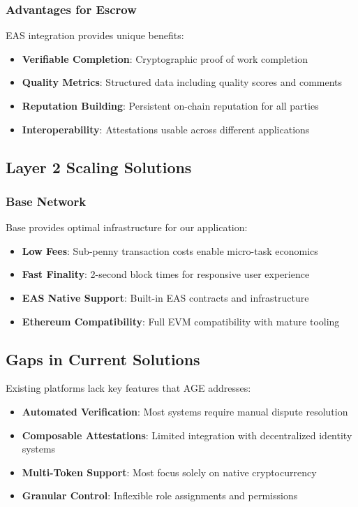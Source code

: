 \documentclass[12pt,a4paper]{article}
\begin{document}
\subsubsection{Advantages for Escrow}
EAS integration provides unique benefits:
\begin{itemize}
    \item \textbf{Verifiable Completion}: Cryptographic proof of work completion
    \item \textbf{Quality Metrics}: Structured data including quality scores and comments
    \item \textbf{Reputation Building}: Persistent on-chain reputation for all parties
    \item \textbf{Interoperability}: Attestations usable across different applications
\end{itemize}

\subsection{Layer 2 Scaling Solutions}

\subsubsection{Base Network}
Base provides optimal infrastructure for our application:
\begin{itemize}
    \item \textbf{Low Fees}: Sub-penny transaction costs enable micro-task economics
    \item \textbf{Fast Finality}: 2-second block times for responsive user experience
    \item \textbf{EAS Native Support}: Built-in EAS contracts and infrastructure
    \item \textbf{Ethereum Compatibility}: Full EVM compatibility with mature tooling
\end{itemize}

\subsection{Gaps in Current Solutions}

Existing platforms lack key features that AGE addresses:
\begin{itemize}
    \item \textbf{Automated Verification}: Most systems require manual dispute resolution
    \item \textbf{Composable Attestations}: Limited integration with decentralized identity systems
    \item \textbf{Multi-Token Support}: Most focus solely on native cryptocurrency
    \item \textbf{Granular Control}: Inflexible role assignments and permissions
\end{itemize}
\end{document}
